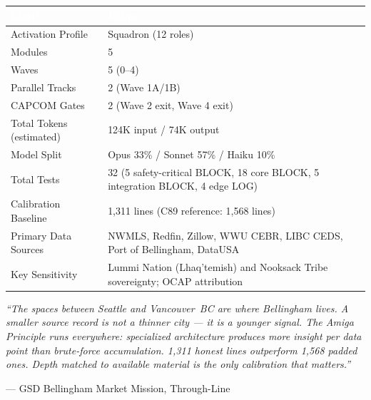 \documentclass[11pt,letterpaper]{article}
\newcommand{\tableheader}[1]{\textbf{\sffamily\textcolor{white}{#1}}}
\begin{document}
\begin{center}
\begin{tabularx}{\textwidth}{L{4cm}X}
\toprule
{}
\tableheader{Metric} & \tableheader{Value} \\
\midrule
Activation Profile & Squadron (12 roles) \\
Modules & 5 \\
Waves & 5 (0--4) \\
Parallel Tracks & 2 (Wave 1A/1B) \\
CAPCOM Gates & 2 (Wave 2 exit, Wave 4 exit) \\
Total Tokens (estimated) & 124K input / 74K output \\
Model Split & Opus 33\% / Sonnet 57\% / Haiku 10\% \\
Total Tests & 32 (5 safety-critical BLOCK, 18 core BLOCK, 5 integration BLOCK, 4 edge LOG) \\
Calibration Baseline & 1,311 lines (C89 reference: 1,568 lines) \\
Primary Data Sources & NWMLS, Redfin, Zillow, WWU CEBR, LIBC CEDS, Port of Bellingham, DataUSA \\
Key Sensitivity & Lummi Nation (Lhaq'temish) and Nooksack Tribe sovereignty; OCAP attribution \\
\bottomrule
\end{tabularx}
\end{center}

\vspace{2em}
\begin{quotebox}
\textit{``The spaces between Seattle and Vancouver~BC are where Bellingham lives. A smaller source record is not a thinner city --- it is a younger signal. The Amiga Principle runs everywhere: specialized architecture produces more insight per data point than brute-force accumulation. 1,311 honest lines outperform 1,568 padded ones. Depth matched to available material is the only calibration that matters.''}

\vspace{0.5em}
\hfill --- GSD Bellingham Market Mission, Through-Line
\end{quotebox}
\end{document}
